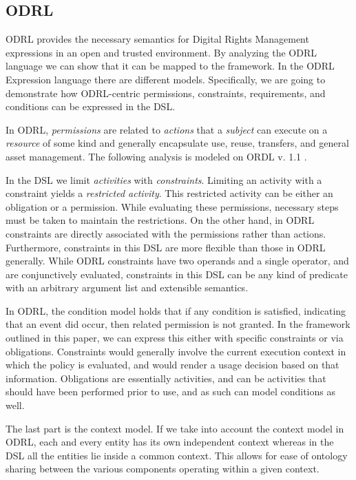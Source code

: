 \subsection{ODRL}\label{sec:model-odrl}
ODRL provides the necessary semantics for Digital Rights Management expressions in an open and trusted environment. By analyzing the ODRL language we can show that it can be mapped to the framework. In the ODRL Expression language there are different models.  Specifically, we are going to demonstrate how ODRL-centric permissions, constraints, requirements, and conditions can be expressed in the DSL.

In ODRL, \emph{permissions} are related to \emph{actions} that a \emph{subject} can execute on a \emph{resource} of some kind and generally encapsulate use, reuse, transfers, and general asset management.  The following analysis is modeled on ORDL v. 1.1 \cite{Ia:02}.

In the DSL we limit \emph{activities} with \emph{constraints}. Limiting an activity with a constraint yields a \emph{restricted activity}. This restricted activity can be either an obligation or a permission. While evaluating these permissions, necessary steps must be taken to maintain the restrictions. On the other hand, in ODRL constraints are directly associated with the permissions rather than actions.  Furthermore, constraints in this DSL are more flexible than those in ODRL generally. While ODRL constraints have two operands and a single operator, and are conjunctively evaluated, constraints in this DSL can be any kind of predicate with an arbitrary argument list and extensible semantics.

In ODRL, the condition model holds that if any condition is satisfied, indicating that an event did occur, then related permission is not granted. In the framework outlined in this paper, we can express this either with specific constraints or via obligations.  Constraints would generally involve the current execution context in which the policy is evaluated, and would render a usage decision based on that information.  Obligations are essentially activities, and can be activities that should have been performed prior to use, and as such can model conditions as well.

The last part is the context model. If we take into account the context model in ODRL, each and every entity has its own independent context whereas in the DSL all the entities lie inside a common context.  This allows for ease of ontology sharing between the various components operating within a given context.

